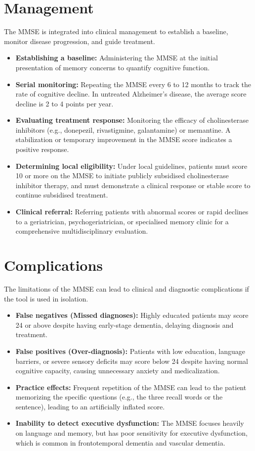 \section*{Management}
The MMSE is integrated into clinical management to establish a baseline, monitor disease progression, and guide treatment.
\begin{itemize}
    \item \textbf{Establishing a baseline:} Administering the MMSE at the initial presentation of memory concerns to quantify cognitive function.
    \item \textbf{Serial monitoring:} Repeating the MMSE every 6 to 12 months to track the rate of cognitive decline. In untreated Alzheimer's disease, the average score decline is 2 to 4 points per year.
    \item \textbf{Evaluating treatment response:} Monitoring the efficacy of cholinesterase inhibitors (e.g., donepezil, rivastigmine, galantamine) or memantine. A stabilization or temporary improvement in the MMSE score indicates a positive response.
    \item \textbf{Determining local eligibility:} Under local guidelines, patients must score 10 or more on the MMSE to initiate publicly subsidised cholinesterase inhibitor therapy, and must demonstrate a clinical response or stable score to continue subsidised treatment.
    \item \textbf{Clinical referral:} Referring patients with abnormal scores or rapid declines to a geriatrician, psychogeriatrician, or specialised memory clinic for a comprehensive multidisciplinary evaluation.
\end{itemize}

\section*{Complications}
The limitations of the MMSE can lead to clinical and diagnostic complications if the tool is used in isolation.
\begin{itemize}
    \item \textbf{False negatives (Missed diagnoses):} Highly educated patients may score 24 or above despite having early-stage dementia, delaying diagnosis and treatment.
    \item \textbf{False positives (Over-diagnosis):} Patients with low education, language barriers, or severe sensory deficits may score below 24 despite having normal cognitive capacity, causing unnecessary anxiety and medicalization.
    \item \textbf{Practice effects:} Frequent repetition of the MMSE can lead to the patient memorizing the specific questions (e.g., the three recall words or the sentence), leading to an artificially inflated score.
    \item \textbf{Inability to detect executive dysfunction:} The MMSE focuses heavily on language and memory, but has poor sensitivity for executive dysfunction, which is common in frontotemporal dementia and vascular dementia.
\end{itemize}

